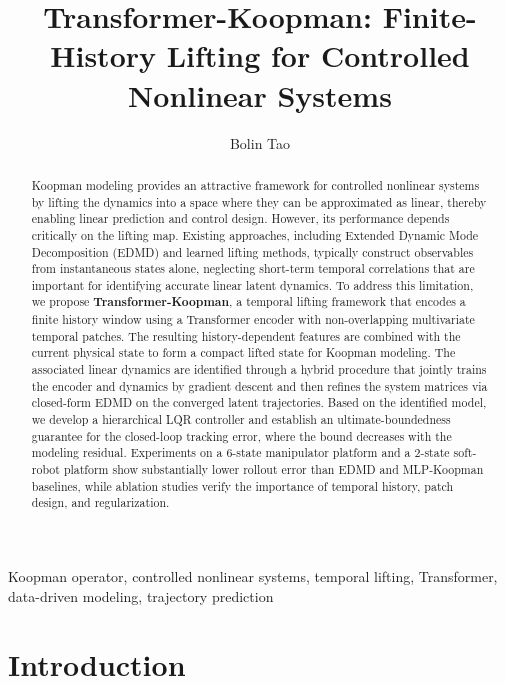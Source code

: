\documentclass[journal]{IEEEtran}
\begin{document}
\title{Transformer-Koopman: Finite-History Lifting for Controlled Nonlinear Systems}

\author{Bolin Tao}


\maketitle

\begin{abstract}
Koopman modeling provides an attractive framework for controlled nonlinear systems by lifting the dynamics into a space where they can be approximated as linear, thereby enabling linear prediction and control design. However, its performance depends critically on the lifting map. Existing approaches, including Extended Dynamic Mode Decomposition (EDMD) and learned lifting methods, typically construct observables from instantaneous states alone, neglecting short-term temporal correlations that are important for identifying accurate linear latent dynamics. To address this limitation, we propose \textbf{Transformer-Koopman}, a temporal lifting framework that encodes a finite history window using a Transformer encoder with non-overlapping multivariate temporal patches. The resulting history-dependent features are combined with the current physical state to form a compact lifted state for Koopman modeling. The associated linear dynamics are identified through a hybrid procedure that jointly trains the encoder and dynamics by gradient descent and then refines the system matrices via closed-form EDMD on the converged latent trajectories. Based on the identified model, we develop a hierarchical LQR controller and establish an ultimate-boundedness guarantee for the closed-loop tracking error, where the bound decreases with the modeling residual. Experiments on a 6-state manipulator platform and a 2-state soft-robot platform show substantially lower rollout error than EDMD and MLP-Koopman baselines, while ablation studies verify the importance of temporal history, patch design, and regularization.
\end{abstract}

\begin{IEEEkeywords}
Koopman operator, controlled nonlinear systems, temporal lifting, Transformer, data-driven modeling, trajectory prediction
\end{IEEEkeywords}

\section{Introduction}
\label{sec:introduction}
\end{document}

